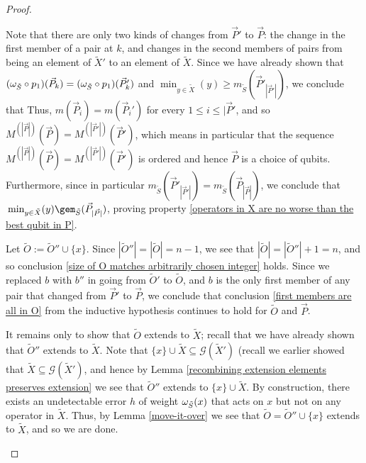 \documentclass[twocolumn,showpacs,preprintnumbers,amsmath,amssymb,nofootinbib,pra,floatfix]{revtex4-1}
\newcommand{\lst}{\vec}
\newcommand{\set}{\tilde}
\newcommand{\genfun}{\mathcal{G}}
\begin{document}
\begin{proof}
\begin{description}
Note that there are only two kinds of changes from $\lst P'$ to $\lst P$:  the change in the first member of a pair at $k$, and changes in the second members of pairs from being an element of $\set X'$ to an element of $\set X$.  Since we have already shown that $(\om_{\set S}\circ p_1)(\lst P_k) = (\om_{\set S}\circ p_1)(\lst P_k')$ and $\min_{y\in\set X}(y) \ge m_{\set S}(\lst P'_{|\lst P'|})$, we conclude that Thus, $m(\lst P_i)=m(\lst P_i')$ for every $1 \le i \le |\lst P'$, and so $M^{(|\lst P|)}(\lst P)=M^{(|\lst P'|)}(\lst P')$, which means in particular that the sequence $M^{(|\lst P|)}(\lst P)=M^{(|\lst P'|)}(\lst P')$ is ordered and hence $\lst P$ is a choice of qubits.  Furthermore, since in particular $m_{\set S}(\lst P'_{|\lst P'|})=m_{\set S}(\lst P_{|\lst P|})$, we conclude that $\min_{y\in\set X}(y)\gem_{\set S}(\lst P_{|\lst P|})$, proving property \ref{operators in X are no worse than the best qubit in P}.

Let $\set O:=\set O''\cup\{x\}$.  Since $|\set O''|=|\set O|=n-1$, we see that $|\set O|=|\set O''|+1=n$, and so conclusion \ref{size of O matches arbitrarily chosen integer} holds.  Since we replaced $b$ with $b''$ in going from $\set O'$ to $\set O$, and $b$ is the only first member of any pair that changed from $\lst P'$ to $\lst P$, we conclude that conclusion \ref{first members are all in O} from the inductive hypothesis continues to hold for $\set O$ and $\lst P$.

It remains only to show that $\set O$ extends to $\set X$;  recall that we have already shown that $\set O''$ extends to $\set X$. Note that $\{x\}\cup\set X\subseteq \genfun(\set X')$ (recall we earlier showed that $\set X\subseteq \genfun(\set X')$, and hence by Lemma \ref{recombining extension elements preserves extension} we see that $\set O''$ extends to $\{x\}\cup\set X$.  By construction, there exists an undetectable error $h$ of weight $\om_{\set S}(x)$ that acts on $x$ but not on any operator in $\set X$.  Thus, by Lemma \ref{move-it-over} we see that $\set O=\set O''\cup\{x\}$ extends to $\set X$, and so we are done.

\end{description}

\end{proof}
\end{document}
